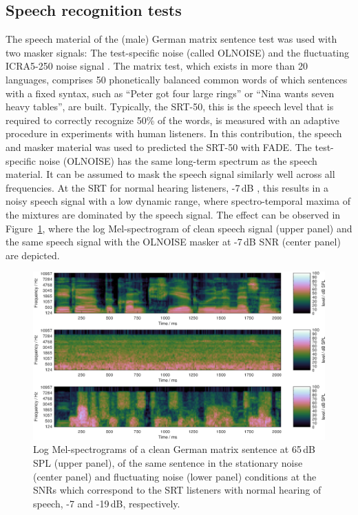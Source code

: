 \documentclass[10pt,a4paper,twocolumn]{article}
\begin{document}
\subsection*{Speech recognition tests}
\label{sec:matrixtests}
%
The speech material of the (male) German matrix sentence test \citep{wagener1999,kollmeier2015} was used with two masker signals: The test-specific noise (called OLNOISE) and the fluctuating ICRA5-250 noise signal \citep{dreschler2001,wagener2006}.
%
The matrix test, which exists in more than 20 languages, comprises 50 phonetically balanced common words of which sentences with a fixed syntax, such as \enquote{Peter got four large rings} or \enquote{Nina wants seven heavy tables}, are built.
%
Typically, the SRT-50, this is the speech level that is required to correctly recognize 50\% of the words, is measured with an adaptive procedure in experiments with human listeners.
%
In this contribution, the speech and masker material was used to predicted the SRT-50 with FADE.
%
The test-specific noise (OLNOISE) has the same long-term spectrum as the speech material.
%
It can be assumed to mask the speech signal similarly well across all frequencies.
%
At the SRT for normal hearing listeners, -7\,dB \citep{hochmuth2015}, this results in a noisy speech signal with a low dynamic range, where spectro-temporal maxima of the mixtures are dominated by the speech signal.
%
The effect can be observed in Figure~\ref{fig:3}, where the log Mel-spectrogram of clean speech signal (upper panel) and the same speech signal with the OLNOISE masker at -7\,dB SNR (center panel) are depicted.
%
\begin{figure}
	\centerline{\includegraphics[width=1.0\textwidth]{images/speech-noise}}
	\caption{Log Mel-spectrograms of a clean German matrix sentence at 65\,dB SPL (upper panel), of the same sentence in the stationary noise (center panel) and fluctuating noise (lower panel) conditions at the SNRs which correspond to the SRT listeners with normal hearing of speech, -7 and -19\,dB, respectively.}
	\label{fig:3}
\end{figure}
\end{document}
